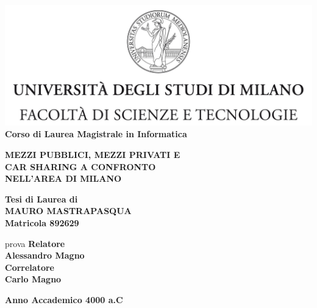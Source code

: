 \documentclass[a4paper]{report}
\begin{document}
	\begin{titlepage}
		\begin{center}
			\includegraphics[width=\textwidth]{Logo.jpg}\\
			{\large{\bf Corso di Laurea Magistrale in Informatica}}
		\end{center}
	
		\vspace{14mm}
		\begin{center}
			{\LARGE{\bf MEZZI PUBBLICI, MEZZI PRIVATI E}}\\
			\vspace{3mm}
			{\LARGE{\bf CAR SHARING A CONFRONTO}}\\
			\vspace{4mm}
			{\LARGE{\bf NELL'AREA DI MILANO}}\\
		\end{center}
	
		\vspace{14mm}
		\begin{center}
			{\large{\bf Tesi di Laurea di}}\\
			\vspace{3mm}
			{\Large{\bf MAURO MASTRAPASQUA}}\\
			\vspace{2mm}
			{\large{\bf Matricola 892629}}\\
		\end{center}
	
		\vspace{14mm}
		\begin{flushleft}	{\large
				prova
			}
			{\normalsize{\bf Relatore}}\\
			\vspace{1mm}
			{\large{\bf Alessandro Magno}}\\
			\vspace{4mm}
			{\normalsize{\bf Correlatore}}\\
			\vspace{1mm}
			{\large{\bf Carlo Magno}}\\
		\end{flushleft}
	
		\vspace{14mm}
		\begin{center}
			{\large{\bf Anno Accademico 4000 a.C}}
		\end{center}
	\end{titlepage}
\end{document}
